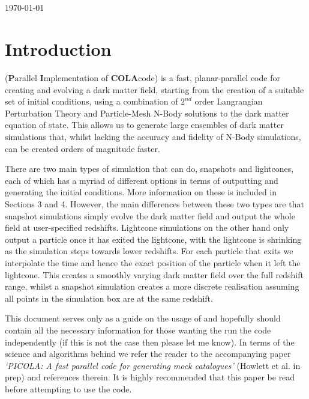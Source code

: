 \documentclass[12pt,twoside,a4paper]{article}
\begin{document}
\begin{titlepage}
\begin{center}
\\[1.0cm]
\\[0.5cm]
\\[0.5cm]
\\[0.5cm]
{\Large \today}\\[1.5cm]
\end{center}
\tableofcontents
\end{titlepage}

\clearpage

\section{Introduction}
{\PICOLA} (\textbf{P}arallel \textbf{I}mplementation of \textbf{COLA}code) is a fast, planar-parallel code for creating and evolving a dark matter field, starting from the creation of a suitable set of initial conditions, using a combination of $2^{nd}$ order Langrangian Perturbation Theory and Particle-Mesh N-Body solutions to the dark matter equation of state. This allows us to generate large ensembles of dark matter simulations that, whilst lacking the accuracy and fidelity of N-Body simulations, can be created orders of magnitude faster.

There are two main types of simulation that {\PICOLA} can do, snapshots and lightcones, each of which has a myriad of different options in terms of outputting and generating the initial conditions. More information on these is included in Sections 3 and 4. However, the main differences between these two types are that snapshot simulations simply evolve the dark matter field and output the whole field at user-specified redshifts. Lightcone simulations on the other hand only output a particle once it has exited the lightcone, with the lightcone is shrinking as the   simulation steps towards lower redshifts. For each particle that exits we interpolate the time and hence the exact position of the particle when it left the lightcone. This creates a smoothly varying dark matter field over the full redshift range, whilst a snapshot simulation creates a more discrete realisation assuming all points in the simulation box are at the same redshift.

This document serves only as a guide on the usage of {\PICOLA} and hopefully should contain all the necessary information for those wanting the run the code independently (if this is not the case then please let me know). In terms of the science and algorithms behind {\PICOLA} we refer the reader to the accompanying paper \emph{`PICOLA: A fast parallel code for generating mock catalogues'} (Howlett et al. in prep) and references therein. It is highly recommended that this paper be read before attempting to use the code.
\end{document}
